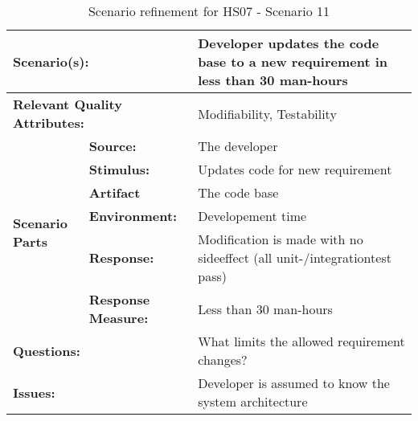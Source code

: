 \documentclass[10pt,a4paper]{article}
\begin{document}
\begin{table}[!htp]
\begin{center}
\begin{tabular}{|p{0.3cm}|p{2.5cm}|p{8cm}|}
  \hline
  \multicolumn{2}{|p{3cm}|}{\bfseries Scenario(s):} & Developer updates the code base to a new requirement in less than 30 man-hours \\
  \hline
  \multicolumn{2}{|p{3cm}|}{\bfseries Relevant Quality Attributes:} & Modifiability, Testability \\
  \hline
  \multirow{6}{*}{\begin{sideways}{\bfseries Scenario Parts}\end{sideways}}
  & {\bfseries Source:} & The developer \\
  \cline{2-3}
  & {\bfseries Stimulus:} & Updates code for new requirement \\
  \cline{2-3}
  & {\bfseries Artifact} & The code base \\
  \cline{2-3}
  & {\bfseries Environment:} & Developement time \\
  \cline{2-3}
  & {\bfseries Response:} & Modification is made with no sideeffect (all unit-/integrationtest pass) \\
  \cline{2-3}
  & {\bfseries Response Measure:} & Less than 30 man-hours \\
  \hline
  \multicolumn{2}{|p{3cm}|}{\bfseries Questions:} & What limits the allowed requirement changes? \\
  \hline
  \multicolumn{2}{|p{3cm}|}{\bfseries Issues:} & Developer is assumed to know the system architecture \\
  \hline
\end{tabular}
\caption{Scenario refinement for HS07 - Scenario 11}
\end{center}
\end{table}
\end{document}
